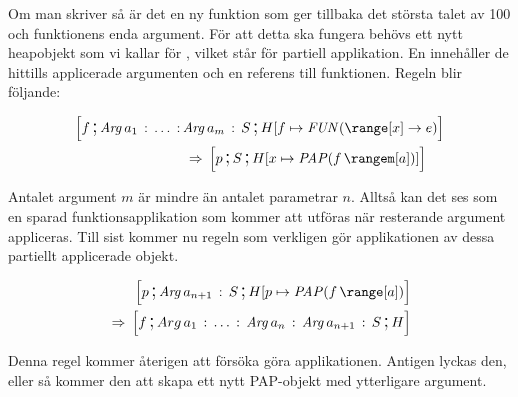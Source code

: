 \documentclass[../Core]{subfiles}
\begin{document}
Om man skriver  så är det en ny funktion som
ger tillbaka det största talet av 100 och funktionens enda argument. För att
detta ska fungera behövs ett nytt heapobjekt som vi kallar för , vilket står för partiell
applikation. En  innehåller de hittills applicerade argumenten och en referens till funktionen.
Regeln blir följande:

\begin{align*}
\conf{}{f \csep \mobj{Arg}\, a_{1} \casep \ldots \casep & \mobj{Arg}\, a_{m} \casep S \csep H[f\mapsto\FUN{\range[x]}e} \\
& \rulesep  \conf{}{p\csep S\csep H[x\mapsto\PAP f{\rangem[a]}]}
\end{align*}


Antalet argument $m$ är mindre än antalet parametrar $n$.
Alltså kan det ses som en sparad funktionsapplikation som kommer att
utföras när resterande argument appliceras. Till sist kommer nu
regeln som verkligen gör applikationen av dessa partiellt applicerade
objekt.

\begin{align*}
\conf{}{p \csep \mobj{Arg}\, a_{n+1} \casep S \csep H[p\mapsto\PAP f{\range[a]}} \\
\rulesep \conf{}{f \csep Arg\, a_{1} \casep \ldots \casep \mobj{Arg}\, a_{n} \casep \mobj{Arg}\, a_{n+1} \casep S \csep H}
\end{align*}


Denna regel kommer återigen att försöka göra applikationen. Antigen lyckas
den, eller så kommer den att skapa ett nytt PAP-objekt med ytterligare
argument.
\end{document}

